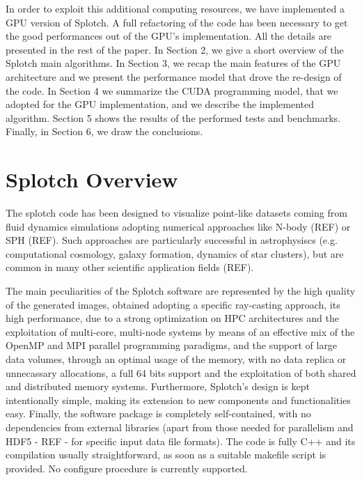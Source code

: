 \documentclass[11pt]{article}
\begin{document}
In order to exploit this additional computing resources, we have implemented 
a GPU version of Splotch. A full refactoring of the code has been necessary 
to get the good performances out of the GPU's implementation. 
All the details are presented in the rest of the paper. In Section 2, we give a short 
overview of the Splotch main algorithms. In Section 3, we recap the main features
of the GPU architecture and we present the performance model that drove the 
re-design of the code. In Section 4 we summarize the CUDA programming model, that we
adopted for the GPU implementation, and we describe the implemented algorithm. Section 5 shows
the results of the performed tests and benchmarks. Finally, in Section 6, we draw 
the conclusions. 

\section{Splotch Overview}

The splotch code has been designed to visualize point-like datasets coming
from fluid dynamics simulations adopting numerical approaches like N-body (REF)
or SPH (REF). Such approaches are particularly successful in astrophysiscs (e.g. computational
cosmology, galaxy formation, dynamics of star clusters), but are common in 
many other scientific application fields (REF).

The main peculiarities of the Splotch software are represented by the 
high quality of the generated images, obtained adopting a specific ray-casting 
approach, its high performance, due to a strong optimization on HPC architectures and the exploitation of multi-core, multi-node 
systems by means of an effective mix of the OpenMP and MPI parallel programming paradigms, and
the support of large data volumes, through an optimal usage of the memory, with
no data replica or unnecassary allocations, a full 64 bits support and the exploitation
of both shared and distributed memory systems. Furthermore, Splotch's design is kept 
intentionally simple, making its extension to new components and functionalities easy. 
Finally, the software package is completely self-contained, with no dependencies from external 
libraries (apart from those needed for parallelism and HDF5 - REF - for
specific input data file formats). The code is fully C++ and its compilation
usually straightforward, as soon as a suitable makefile script is provided.
No configure procedure is currently supported.
\end{document}
